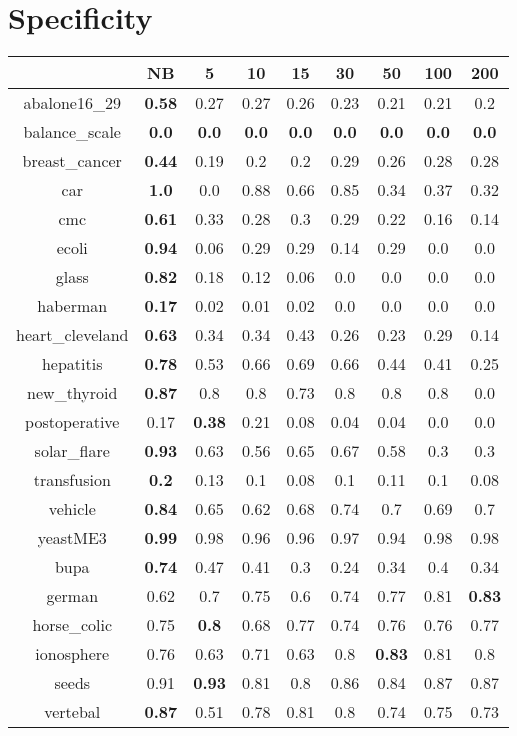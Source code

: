 \documentclass{article}%
\begin{document}
%
\section*{Specificity}%
\begin{tabular}{c|cccccccc}%
\hline%
&NB&5&10&15&30&50&100&200\\%
\hline%
abalone16\_29&\textbf{0.58}&0.27&0.27&0.26&0.23&0.21&0.21&0.2\\%
\hline%
balance\_scale&\textbf{0.0}&\textbf{0.0}&\textbf{0.0}&\textbf{0.0}&\textbf{0.0}&\textbf{0.0}&\textbf{0.0}&\textbf{0.0}\\%
\hline%
breast\_cancer&\textbf{0.44}&0.19&0.2&0.2&0.29&0.26&0.28&0.28\\%
\hline%
car&\textbf{1.0}&0.0&0.88&0.66&0.85&0.34&0.37&0.32\\%
\hline%
cmc&\textbf{0.61}&0.33&0.28&0.3&0.29&0.22&0.16&0.14\\%
\hline%
ecoli&\textbf{0.94}&0.06&0.29&0.29&0.14&0.29&0.0&0.0\\%
\hline%
glass&\textbf{0.82}&0.18&0.12&0.06&0.0&0.0&0.0&0.0\\%
\hline%
haberman&\textbf{0.17}&0.02&0.01&0.02&0.0&0.0&0.0&0.0\\%
\hline%
heart\_cleveland&\textbf{0.63}&0.34&0.34&0.43&0.26&0.23&0.29&0.14\\%
\hline%
hepatitis&\textbf{0.78}&0.53&0.66&0.69&0.66&0.44&0.41&0.25\\%
\hline%
new\_thyroid&\textbf{0.87}&0.8&0.8&0.73&0.8&0.8&0.8&0.0\\%
\hline%
postoperative&0.17&\textbf{0.38}&0.21&0.08&0.04&0.04&0.0&0.0\\%
\hline%
solar\_flare&\textbf{0.93}&0.63&0.56&0.65&0.67&0.58&0.3&0.3\\%
\hline%
transfusion&\textbf{0.2}&0.13&0.1&0.08&0.1&0.11&0.1&0.08\\%
\hline%
vehicle&\textbf{0.84}&0.65&0.62&0.68&0.74&0.7&0.69&0.7\\%
\hline%
yeastME3&\textbf{0.99}&0.98&0.96&0.96&0.97&0.94&0.98&0.98\\%
\hline%
bupa&\textbf{0.74}&0.47&0.41&0.3&0.24&0.34&0.4&0.34\\%
\hline%
german&0.62&0.7&0.75&0.6&0.74&0.77&0.81&\textbf{0.83}\\%
\hline%
horse\_colic&0.75&\textbf{0.8}&0.68&0.77&0.74&0.76&0.76&0.77\\%
\hline%
ionosphere&0.76&0.63&0.71&0.63&0.8&\textbf{0.83}&0.81&0.8\\%
\hline%
seeds&0.91&\textbf{0.93}&0.81&0.8&0.86&0.84&0.87&0.87\\%
\hline%
vertebal&\textbf{0.87}&0.51&0.78&0.81&0.8&0.74&0.75&0.73\\%
\hline%
\end{tabular}
\end{document}
